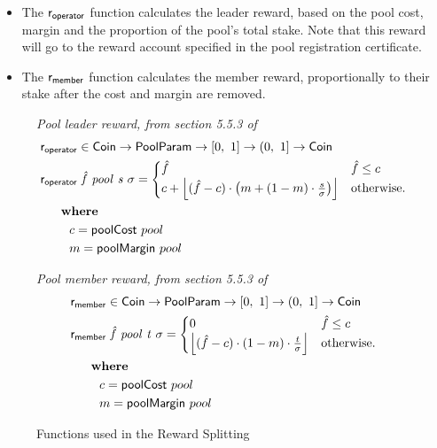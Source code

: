 \begin{itemize}
  \item The $\fun{r_{operator}}$ function calculates the leader reward, based on the pool cost,
    margin and the proportion of the pool's total stake.  Note that this reward will go to the
    reward account specified in the pool registration certificate.
  \item The $\fun{r_{member}}$ function calculates the member reward, proportionally to their
    stake after the cost and margin are removed.
\end{itemize}

\begin{figure}[htb]
  \emph{Pool leader reward, from section 5.5.3 of \cite{delegation_design}}
  \begin{align*}
      & \fun{r_{operator}} \in \Coin \to \PoolParam \to \unitInterval \to \unitIntervalNonNull \to \Coin \\
      & \lReward{\hat{f}}{pool}{s}{\sigma} =
        \begin{cases}
        \hat{f} & \hat{f} \leq c\\
        c + \floor*{(\hat{f} - c)\cdot\left(m + (1-m)\cdot\frac{s}{\sigma}\right) }&
        \text{otherwise.}
      \end{cases} \\
      & ~~~\where \\
      & ~~~~~~~c = \fun{poolCost}~pool \\
      & ~~~~~~~m = \fun{poolMargin}~pool \\
  \end{align*}

  \emph{Pool member reward, from section 5.5.3 of \cite{delegation_design}}
  \begin{align*}
    & \fun{r_{member}} \in \Coin \to \PoolParam \to \unitInterval \to \unitIntervalNonNull \to \Coin \\
    & \mReward{\hat{f}}{pool}{t}{\sigma} =
      \begin{cases}
        0 & \hat{f} \leq c\\
        \floor*{(\hat{f} - c)\cdot(1-m)\cdot\frac{t}{\sigma}} &
        \text{otherwise.}
      \end{cases} \\
    & ~~~\where \\
    & ~~~~~~~c = \fun{poolCost}~pool \\
    & ~~~~~~~m = \fun{poolMargin}~pool \\
  \end{align*}

  \caption{Functions used in the Reward Splitting}
  \label{fig:functions:reward-splitting}
\end{figure}


